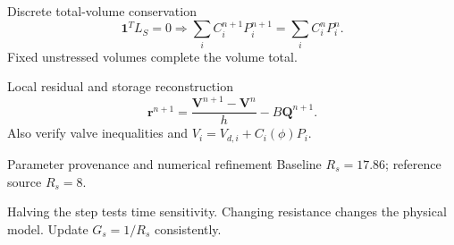 \documentclass[aspectratio=169,11pt]{beamer}
\newcommand{\notestarget}{notes.pdf}\newcommand{\noteslabel}{Notes}
\begin{document}
\renewcommand{\notestarget}{notes.pdf\#note-matched-state-residuals-and-conservation}
\begin{frame}[t,fragile,label=slide-discrete-total-volume-conservation]{Discrete total-volume conservation}
\[\mathbf1^TL_S=0\Rightarrow\sum_iC_i^{n+1}P_i^{n+1}=\sum_iC_i^nP_i^n.\]\pause{} Fixed unstressed volumes complete the volume total.
\end{frame}
\renewcommand{\notestarget}{notes.pdf\#note-matched-state-residuals-and-conservation}
\begin{frame}[t,fragile,label=slide-local-residual-and-storage-reconstruction]{Local residual and storage reconstruction}
\[\mathbf r^{n+1}=\frac{\mathbf V^{n+1}-\mathbf V^n}{h}-B\mathbf Q^{n+1}.\]\pause{} Also verify valve inequalities and $V_i=V_{d,i}+C_i(\phi)P_i$.
\end{frame}
\renewcommand{\notestarget}{notes.pdf\#note-matched-state-residuals-and-conservation}
\begin{frame}[t,fragile,label=slide-parameter-provenance-and-numerical-refinement]{Parameter provenance and numerical refinement}
Baseline $R_s=17.86$; reference source $R_s=8$.\pause{}\par Halving the step tests time sensitivity. Changing resistance changes the physical model. Update $G_s=1/R_s$ consistently.
\end{frame}
\end{document}
